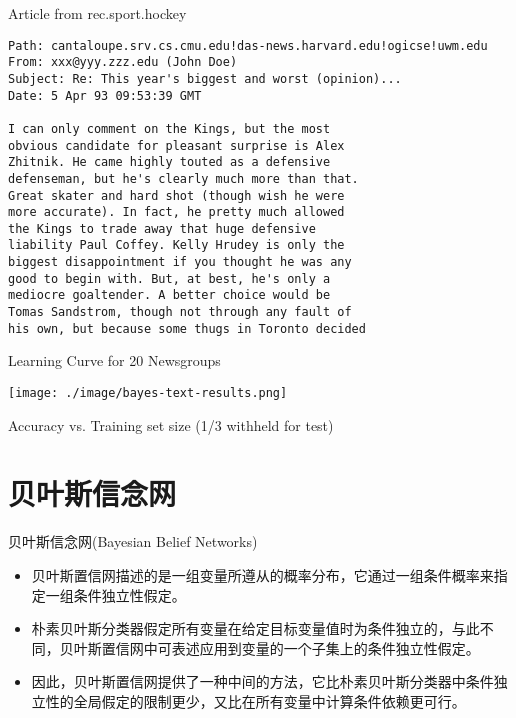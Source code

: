 \documentclass[presentation]{beamer}
\begin{document}
\begin{frame}[fragile,label={sec:org3f0f0e6}]{Article from rec.sport.hockey}
 \small
\begin{verbatim}
Path: cantaloupe.srv.cs.cmu.edu!das-news.harvard.edu!ogicse!uwm.edu
From: xxx@yyy.zzz.edu (John Doe)
Subject: Re: This year's biggest and worst (opinion)...
Date: 5 Apr 93 09:53:39 GMT

I can only comment on the Kings, but the most 
obvious candidate for pleasant surprise is Alex
Zhitnik. He came highly touted as a defensive 
defenseman, but he's clearly much more than that. 
Great skater and hard shot (though wish he were 
more accurate). In fact, he pretty much allowed 
the Kings to trade away that huge defensive 
liability Paul Coffey. Kelly Hrudey is only the 
biggest disappointment if you thought he was any 
good to begin with. But, at best, he's only a 
mediocre goaltender. A better choice would be 
Tomas Sandstrom, though not through any fault of 
his own, but because some thugs in Toronto decided 
\end{verbatim}
\end{frame}

\begin{frame}[label={sec:orgaa08894}]{Learning Curve for 20 Newsgroups}
\begin{center}
\texttt{[image: ./image/bayes-text-results.png]}
\end{center}

\centerline{Accuracy vs. Training set size (1/3 withheld for test)}
\end{frame}

\section{贝叶斯信念网}
\label{sec:org8a22956}

\begin{frame}[label={sec:orgea38997}]{贝叶斯信念网(Bayesian Belief Networks)}
\begin{itemize}
\item 贝叶斯置信网描述的是一组变量所遵从的概率分布，它通过一组条件概率来指定一组条件独立性假定。
\item 朴素贝叶斯分类器假定所有变量在给定目标变量值时为条件独立的，与此不同，贝叶斯置信网中可表述应用到变量的一个子集上的条件独立性假定。
\item 因此，贝叶斯置信网提供了一种中间的方法，它比朴素贝叶斯分类器中条件独立性的全局假定的限制更少，又比在所有变量中计算条件依赖更可行。
\end{itemize}
\end{frame}
\end{document}
